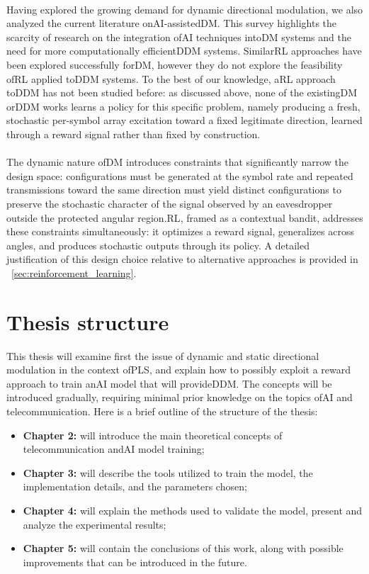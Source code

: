 \\
Having explored the growing demand for dynamic directional modulation, we also analyzed the current literature on\gls{AI}-assisted\gls{DM}. This survey \cite{chen2025survey} highlights the scarcity of research on the integration of\gls{AI} techniques into\gls{DM} systems and the need for more computationally efficient\gls{DDM} systems. Similar\gls{RL} approaches have been explored \cite{li2026rlris} successfully for\gls{DM}, however they do not explore the feasibility of\gls{RL} applied to\gls{DDM} systems. To the best of our knowledge, a\gls{RL} approach to\gls{DDM} has not been studied before: as discussed above, none of the existing\gls{DM} or\gls{DDM} works learns a policy for this specific problem, namely producing a fresh, stochastic per-symbol array excitation toward a fixed legitimate direction, learned through a reward signal rather than fixed by construction. \\
\\
The dynamic nature of\gls{DM} introduces constraints that significantly narrow the design space: configurations must be generated at the symbol rate and repeated transmissions toward the same direction must yield distinct configurations to preserve the stochastic character of the signal observed by an eavesdropper outside the protected angular region.\gls{RL}, framed as a contextual bandit, addresses these constraints simultaneously: it optimizes a reward signal, generalizes across angles, and produces stochastic outputs through its policy. A detailed justification of this design choice relative to alternative approaches is provided in \sectionname~\ref{sec:reinforcement_learning}.
\section{Thesis structure}
This thesis will examine first the issue of dynamic and static directional modulation in the context of\gls{PLS}, and explain how to possibly exploit a reward approach to train an\gls{AI} model that will provide\gls{DDM}. The concepts will be introduced gradually, requiring minimal prior knowledge on the topics of\gls{AI} and telecommunication. Here is a brief outline of the structure of the thesis:

\begin{itemize}
	\item \textbf{Chapter 2:} will introduce the main theoretical concepts of telecommunication and\gls{AI} model training;
	\item \textbf{Chapter 3:} will describe the tools utilized to train the model, the implementation details, and the parameters chosen;
	\item \textbf{Chapter 4:} will explain the methods used to validate the model, present and analyze the experimental results;
	\item \textbf{Chapter 5:} will contain the conclusions of this work, along with possible improvements  that can be introduced in the future.
\end{itemize}